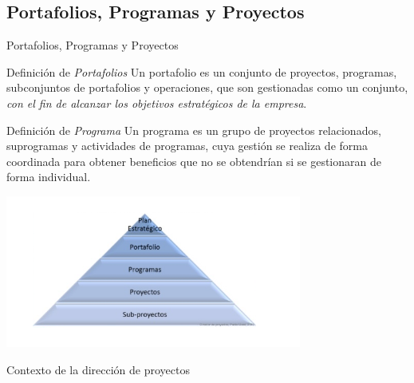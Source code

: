 \subsection{Portafolios, Programas y Proyectos}
\begin{frame}[allowframebreaks]{Portafolios, Programas y Proyectos}
	
	\begin{block}{Definición de \emph{Portafolios}}
		Un portafolio es un conjunto de proyectos, programas, subconjuntos de  portafolios y operaciones, que son gestionadas como un conjunto, \emph{con el fin de alcanzar los objetivos estratégicos de la empresa}.
	\end{block}


	\framebreak

	\begin{block}{Definición de \emph{Programa}}
		Un programa es un grupo de proyectos relacionados, suprogramas y actividades de programas, cuya gestión se realiza de forma coordinada para obtener beneficios que no se obtendrían si se gestionaran de forma individual.
	\end{block}


	\framebreak
	\begin{center}
		\includegraphics[height=5cm]{figuras/proy_prog_port_00.png}

		Contexto de la dirección de proyectos
	\end{center}

\end{frame}


